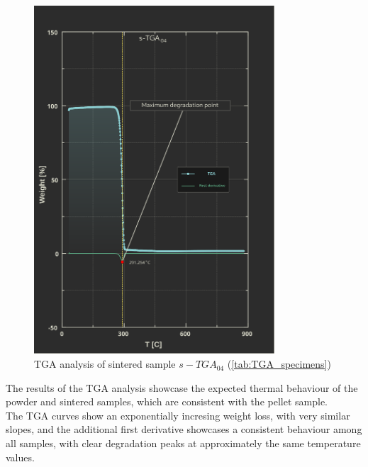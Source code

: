 \documentclass{article}
\begin{document}
            \begin{figure}[h!]
                \centering
                \includegraphics[width=0.8\textwidth]{Pictures/Thermal_analysis_plots/TGA_catalogued/s-TGA04.eps}
                \caption{TGA analysis of sintered sample $s-TGA_{04}$ (\ref{tab:TGA_specimens})}
                \label{fig:TGA_04}
            \end{figure}

            \clearpage

            The results of the TGA analysis showcase the expected thermal behaviour of the powder and sintered samples,
            which are consistent with the pellet sample. \\ 

            The TGA curves show an exponentially incresing weight loss, with very similar slopes, and the additional 
            first derivative showcases a consistent behaviour among all samples, with clear degradation peaks at approximately 
            the same temperature values. \\ 
            
\end{document}

